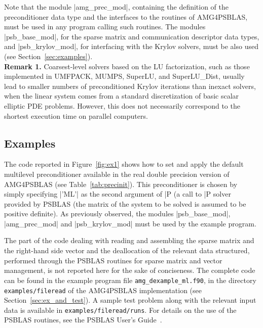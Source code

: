 Note that the module \fortinline|amg_prec_mod|, containing the definition of the
preconditioner data type and the interfaces to the routines of AMG4PSBLAS,
must be used in any program calling such routines.
The modules \fortinline|psb_base_mod|, for the sparse matrix and communication descriptor
data types, and \fortinline|psb_krylov_mod|, for interfacing with the
Krylov solvers, must be also used (see Section~\ref{sec:examples}). \\

\textbf{Remark 1.} Coarsest-level solvers based on the LU factorization,
such as those implemented in UMFPACK, MUMPS, SuperLU, and SuperLU\_Dist,
usually lead to smaller numbers of preconditioned Krylov
iterations than inexact solvers, when the linear system comes from
a standard discretization of basic scalar elliptic PDE problems. However,
this does not necessarily correspond to the shortest execution time
on parallel computers.


\subsection{Examples\label{sec:examples}}

The code reported in Figure~\ref{fig:ex1} shows how to set and apply the default
multilevel preconditioner available in the real double precision version
of AMG4PSBLAS (see Table~\ref{tab:precinit}). This preconditioner is chosen
by simply specifying \fortinline|'ML'| as the second argument of \fortinline|P%
(a call to \fortinline|P%
solver provided by PSBLAS (the matrix of the system to be solved is
assumed to be positive definite). As previously observed, the modules
\fortinline|psb_base_mod|, \fortinline|amg_prec_mod| and \fortinline|psb_krylov_mod|
must be used by the example program.

The part of the code dealing with reading and assembling  the sparse
matrix and the right-hand side vector and the deallocation of the
relevant data structured, performed 
through the PSBLAS routines for sparse matrix and vector management, is not reported
here for the sake of conciseness.
The complete code can be found in the example program file \verb|amg_dexample_ml.f90|,
in the directory \verb|examples/fileread| of the AMG4PSBLAS implementation (see
Section~\ref{sec:ex_and_test}). A sample test problem along with the relevant
input data is available in \verb|examples/fileread/runs|.
For details on the use of the PSBLAS routines, see the PSBLAS User's
Guide~\cite{PSBLASGUIDE}.

